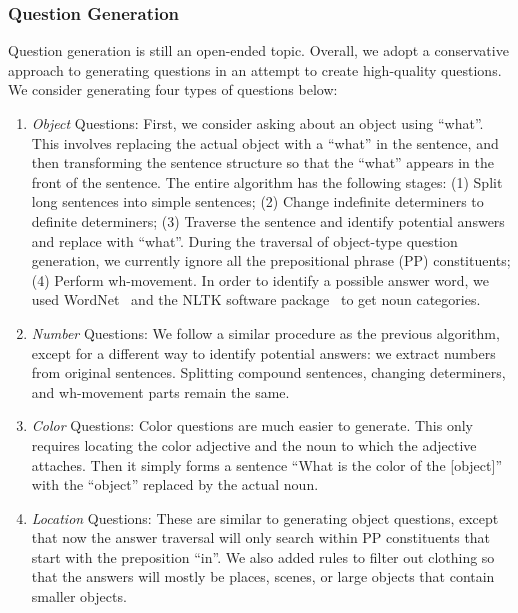 \documentclass{article} \usepackage{nips15submit_e,times}
\renewcommand{\#}[1]{\textbf{#1}}
\begin{document}
\subsubsection{Question Generation}
Question generation is still an open-ended topic. Overall, we adopt a conservative 
approach to generating questions in an attempt to create high-quality questions. We 
consider generating four types of questions below:

\begin{enumerate}[leftmargin=*]
\item {\it Object} Questions: First, we consider asking about an
object using ``what''. This involves replacing the actual object with a
``what'' in the sentence, and then transforming the sentence structure so that
the ``what'' appears in the front of the sentence. The entire algorithm has the
following stages: (1) Split long sentences into simple sentences; (2) Change
indefinite determiners to definite determiners; (3) Traverse the sentence and
identify potential answers and replace with ``what''. During the traversal of
object-type question generation, we currently ignore all the prepositional
phrase (PP) constituents; (4) Perform wh-movement. In order to identify a
possible answer word, we used WordNet~\cite{wordnet} and the NLTK software
package~\cite{nltk} to get noun categories.

\item {\it Number} Questions: We follow a similar procedure as the
previous algorithm, except for a different way to identify potential answers:
we extract numbers from original sentences. Splitting compound sentences,
changing determiners, and wh-movement parts remain the same.

\item {\it Color} Questions: Color questions are much easier to
generate. This only requires locating the color adjective and the noun to which
the adjective attaches. Then it simply forms a sentence ``What is the color of
the [object]'' with the ``object'' replaced by the actual noun.

\item {\it Location} Questions: These are similar to generating object
questions, except that now the answer traversal will only search within PP
constituents that start with the preposition ``in''. We also added rules to
filter out clothing so that the answers will mostly be places, scenes, or large
objects that contain smaller objects.
\end{enumerate}
\end{document}

